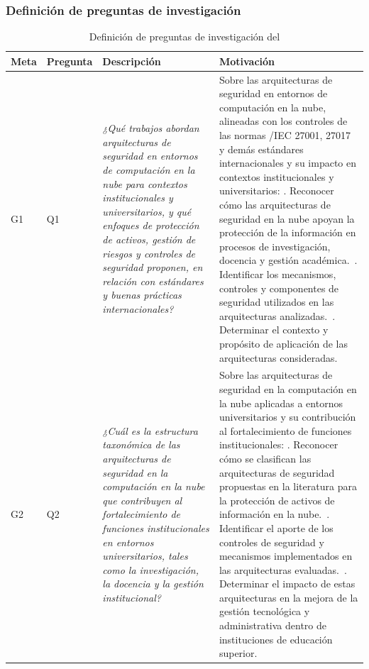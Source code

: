 \subsubsection{Definición de preguntas de investigación}\label{subsubsec:RQ-def}
\begin{table}[H]
	\centering
	\renewcommand{\arraystretch}{1.2} %
	\fontsize{9pt}{10pt}\selectfont %
	\begin{tabular}{|p{0.7cm}|p{1.3cm}|p{5.5cm}|p{6cm}|} %
		\hline
		\textbf{Meta} & \textbf{Pregunta} & \textbf{Descripción} & \textbf{Motivación}        \\ 
		\hline
		G1  & Q1 & \textit{¿Qué trabajos abordan arquitecturas de seguridad en entornos de computación en la nube para contextos institucionales y universitarios, y qué enfoques de protección de activos, gestión de riesgos y controles de seguridad proponen, en relación con estándares y buenas prácticas internacionales?} &
		Sobre las arquitecturas de seguridad en entornos de computación en la nube, alineadas con los controles de las normas \ISO/IEC 27001, 27017 y demás estándares internacionales y su impacto en contextos institucionales y universitarios: \newline
		1. Reconocer cómo las arquitecturas de seguridad en la nube apoyan la protección de la información en procesos de investigación, docencia y gestión académica.~\newline
    	2. Identificar los mecanismos, controles y componentes de seguridad utilizados en las arquitecturas analizadas.~\newline
    	3. Determinar el contexto y propósito de aplicación de las arquitecturas consideradas. \\
		\hline
		G2 & Q2 & \textit{¿Cuál es la estructura taxonómica de las arquitecturas de seguridad en la computación en la nube que contribuyen al fortalecimiento de funciones institucionales en entornos universitarios, tales como la investigación, la docencia y la gestión institucional?} &
		Sobre las arquitecturas de seguridad en la computación en la nube aplicadas a entornos universitarios y su contribución al fortalecimiento de funciones institucionales: \newline
    	1. Reconocer cómo se clasifican las arquitecturas de seguridad propuestas en la literatura para la protección de activos de información en la nube.~\newline
    	2. Identificar el aporte de los controles de seguridad y mecanismos implementados en las arquitecturas evaluadas.~\newline
    	3. Determinar el impacto de estas arquitecturas en la mejora de la gestión tecnológica y administrativa dentro de instituciones de educación superior. \\
		\hline
	\end{tabular}
	\caption{Definición de preguntas de investigación del \SMS}\label{tab:preguntas}
\end{table}

